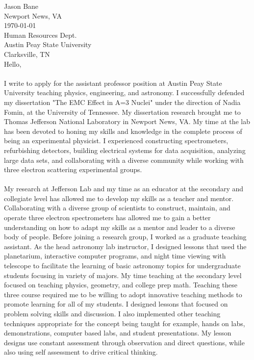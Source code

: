 \documentclass[12pt,letterpaper]{article}
\begin{document}
\vspace*{-1.2cm}
\noindent Jason Bane\\
Newport News, VA \\
\today\\

\noindent Human Resources Dept.\\
Austin Peay State University\\
Clarksville, TN \\


Hello, 

\paragraph{}I write to apply for the assistant professor position at Austin Peay State University teaching physics, engineering, and astronomy. I successfully defended my dissertation "The EMC Effect in A=3 Nuclei" under the direction of Nadia Fomin, at the University of Tennessee. My dissertation research brought me to Thomas Jefferson National Laboratory in Newport News, VA. My time at the lab has been devoted to honing my skills and knowledge in the complete process of being an experimental physicist. I experienced constructing spectrometers, refurbishing detectors, building electrical systems for data acquisition, analyzing large data sets, and collaborating with a diverse community while working with three electron scattering experimental groups.
\paragraph{}My research at Jefferson Lab and my time as an educator at the secondary and collegiate level has allowed me to develop my skills as a teacher and mentor. Collaborating with a diverse group of scientists to construct, maintain, and operate three electron spectrometers has allowed me to gain a better understanding on how to adapt my skills as a mentor and leader to a diverse body of people. Before joining a research group, I worked as a graduate teaching assistant. As the head astronomy lab instructor, I designed lessons that used the planetarium, interactive computer programs, and night time viewing with telescope to facilitate the learning of basic astronomy topics for undergraduate students focusing in variety of majors. My time teaching at the secondary level focused on teaching physics, geometry, and  college prep math. Teaching these three course required me to be willing to adopt innovative teaching methods to promote learning for all of my students. I designed lessons that focused on problem solving skills and discussion. I also implemented other teaching techniques appropriate for the concept being taught for example, hands on labs, demonstrations, computer based labs, and student presentations. My lesson designs use constant assessment through observation and direct questions, while also using self assessment to drive critical thinking. 
\end{document}

